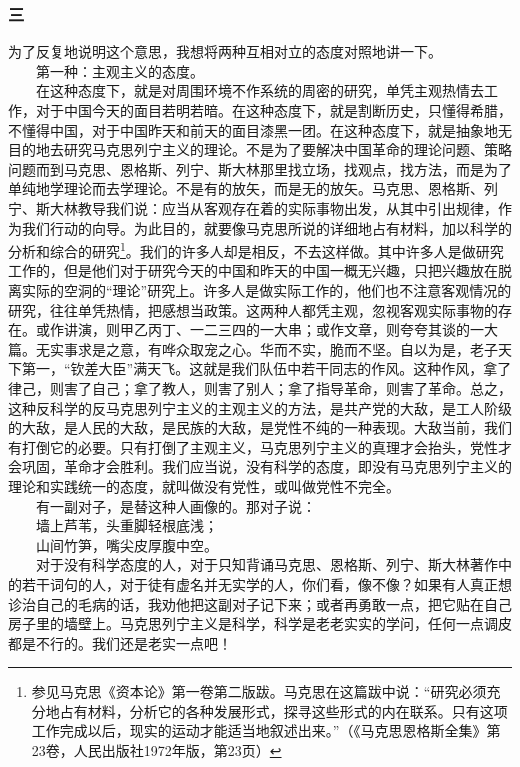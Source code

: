 \documentclass[cn,11pt,chinese]{elegantbook}
\def\myformat#1{\hfil\hfil #1}
\begin{document}
\subsubsection*{\myformat{三}}
为了反复地说明这个意思，我想将两种互相对立的态度对照地讲一下。\\
　　第一种：主观主义的态度。\\
　　在这种态度下，就是对周围环境不作系统的周密的研究，单凭主观热情去工作，对于中国今天的面目若明若暗。在这种态度下，就是割断历史，只懂得希腊，不懂得中国，对于中国昨天和前天的面目漆黑一团。在这种态度下，就是抽象地无目的地去研究马克思列宁主义的理论。不是为了要解决中国革命的理论问题、策略问题而到马克思、恩格斯、列宁、斯大林那里找立场，找观点，找方法，而是为了单纯地学理论而去学理论。不是有的放矢，而是无的放矢。马克思、恩格斯、列宁、斯大林教导我们说：应当从客观存在着的实际事物出发，从其中引出规律，作为我们行动的向导。为此目的，就要像马克思所说的详细地占有材料，加以科学的分析和综合的研究\footnote[3]{ 参见马克思《资本论》第一卷第二版跋。马克思在这篇跋中说：“研究必须充分地占有材料，分析它的各种发展形式，探寻这些形式的内在联系。只有这项工作完成以后，现实的运动才能适当地叙述出来。”（《马克思恩格斯全集》第23卷，人民出版社1972年版，第23页）}。我们的许多人却是相反，不去这样做。其中许多人是做研究工作的，但是他们对于研究今天的中国和昨天的中国一概无兴趣，只把兴趣放在脱离实际的空洞的“理论”研究上。许多人是做实际工作的，他们也不注意客观情况的研究，往往单凭热情，把感想当政策。这两种人都凭主观，忽视客观实际事物的存在。或作讲演，则甲乙丙丁、一二三四的一大串；或作文章，则夸夸其谈的一大篇。无实事求是之意，有哗众取宠之心。华而不实，脆而不坚。自以为是，老子天下第一，“钦差大臣”满天飞。这就是我们队伍中若干同志的作风。这种作风，拿了律己，则害了自己；拿了教人，则害了别人；拿了指导革命，则害了革命。总之，这种反科学的反马克思列宁主义的主观主义的方法，是共产党的大敌，是工人阶级的大敌，是人民的大敌，是民族的大敌，是党性不纯的一种表现。大敌当前，我们有打倒它的必要。只有打倒了主观主义，马克思列宁主义的真理才会抬头，党性才会巩固，革命才会胜利。我们应当说，没有科学的态度，即没有马克思列宁主义的理论和实践统一的态度，就叫做没有党性，或叫做党性不完全。\\
　　有一副对子，是替这种人画像的。那对子说：\\
　　墙上芦苇，头重脚轻根底浅；\\
　　山间竹笋，嘴尖皮厚腹中空。\\
　　对于没有科学态度的人，对于只知背诵马克思、恩格斯、列宁、斯大林著作中的若干词句的人，对于徒有虚名并无实学的人，你们看，像不像？如果有人真正想诊治自己的毛病的话，我劝他把这副对子记下来；或者再勇敢一点，把它贴在自己房子里的墙壁上。马克思列宁主义是科学，科学是老老实实的学问，任何一点调皮都是不行的。我们还是老实一点吧！\\
\end{document}
